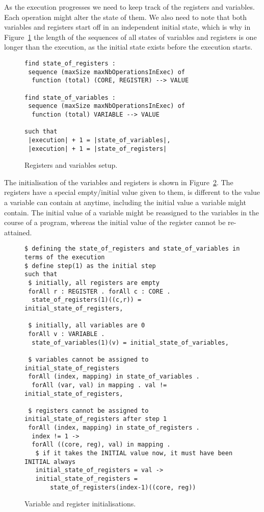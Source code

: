 \documentclass[runningheads]{llncs}
\begin{document}
As the execution progresses we need to keep track of the registers and variables.
Each operation might alter the state of them.
We also need to note that both variables and registers start off in an independent initial state, which is why in Figure~\ref{fig:essence4} the length of the sequences of all states of variables and registers is one longer than the execution, as the initial state exists before the execution starts.

\begin{figure}
\begin{lstlisting}
find state_of_registers :
 sequence (maxSize maxNbOperationsInExec) of
  function (total) (CORE, REGISTER) --> VALUE

find state_of_variables :
 sequence (maxSize maxNbOperationsInExec) of
  function (total) VARIABLE --> VALUE

such that
 |execution| + 1 = |state_of_variables|,
 |execution| + 1 = |state_of_registers|
\end{lstlisting}
\caption{Registers and variables setup. \label{fig:essence4}}
\end{figure}


The initialisation of the variables and registers is shown in Figure~\ref{fig:essence-step1}.
The registers have a special empty/initial value given to them, is different to the value a variable can contain at anytime, including the initial value a variable might contain.
The initial value of a variable might be reassigned to the variables in the course of a program, whereas the initial value of the register cannot be re-attained.

\begin{figure}
\begin{lstlisting}
$ defining the state_of_registers and state_of_variables in terms of the execution
$ define step(1) as the initial step
such that
 $ initially, all registers are empty
 forAll r : REGISTER . forAll c : CORE .
  state_of_registers(1)((c,r)) = initial_state_of_registers,

 $ initially, all variables are 0
 forAll v : VARIABLE .
  state_of_variables(1)(v) = initial_state_of_variables,

 $ variables cannot be assigned to initial_state_of_registers
 forAll (index, mapping) in state_of_variables .
  forAll (var, val) in mapping . val != initial_state_of_registers,

 $ registers cannot be assigned to initial_state_of_registers after step 1
 forAll (index, mapping) in state_of_registers .
  index != 1 ->
  forAll ((core, reg), val) in mapping .
   $ if it takes the INITIAL value now, it must have been INITIAL always
   initial_state_of_registers = val ->
   initial_state_of_registers =
       state_of_registers(index-1)((core, reg))
\end{lstlisting}
\caption{Variable and register initialisations.\label{fig:essence-step1}}
\end{figure}
\end{document}
